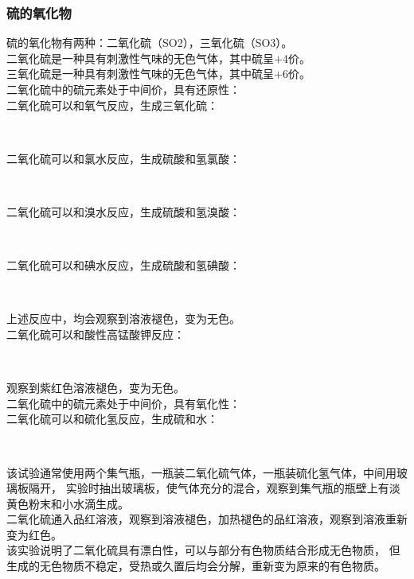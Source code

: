 \documentclass[UTF8]{ctexart}
\begin{document}
\newpage

\subsubsection{硫的氧化物}
    硫的氧化物有两种：二氧化硫（SO2），三氧化硫（SO3）。\\[4mm]
    二氧化硫是一种具有刺激性气味的无色气体，其中硫呈$+4$价。\\[2mm]
    三氧化硫是一种具有刺激性气味的无色气体，其中硫呈$+6$价。\\[6mm]
    二氧化硫中的硫元素处于中间价，具有还原性：\\[3mm]
    二氧化硫可以和氧气反应，生成三氧化硫：
    \begin{center}
        \\[3mm]
    \end{center}
    二氧化硫可以和氯水反应，生成硫酸和氢氯酸：
    \begin{center}
        \\[3mm]
    \end{center}
    二氧化硫可以和溴水反应，生成硫酸和氢溴酸：
    \begin{center}
        \\[3mm]
    \end{center}
    二氧化硫可以和碘水反应，生成硫酸和氢碘酸：
    \begin{center}
        \\[3mm]
    \end{center}
    上述反应中，均会观察到溶液褪色，变为无色。\\[5mm]
    二氧化硫可以和酸性高锰酸钾反应：
    \begin{center}
        \\[3mm]
    \end{center}
    观察到紫红色溶液褪色，变为无色。\\[8mm]
    二氧化硫中的硫元素处于中间价，具有氧化性：\\[3mm]
    二氧化硫可以和硫化氢反应，生成硫和水：
    \begin{center}
        \\[3mm]
    \end{center}
    该试验通常使用两个集气瓶，一瓶装二氧化硫气体，一瓶装硫化氢气体，中间用玻璃板隔开，
    实验时抽出玻璃板，使气体充分的混合，观察到集气瓶的瓶壁上有淡黄色粉末和小水滴生成。\\[10mm]
    二氧化硫通入品红溶液，观察到溶液褪色，加热褪色的品红溶液，观察到溶液重新变为红色。\\[3mm]
    该实验说明了二氧化硫具有漂白性，可以与部分有色物质结合形成无色物质，
    但生成的无色物质不稳定，受热或久置后均会分解，重新变为原来的有色物质。
\end{document}
